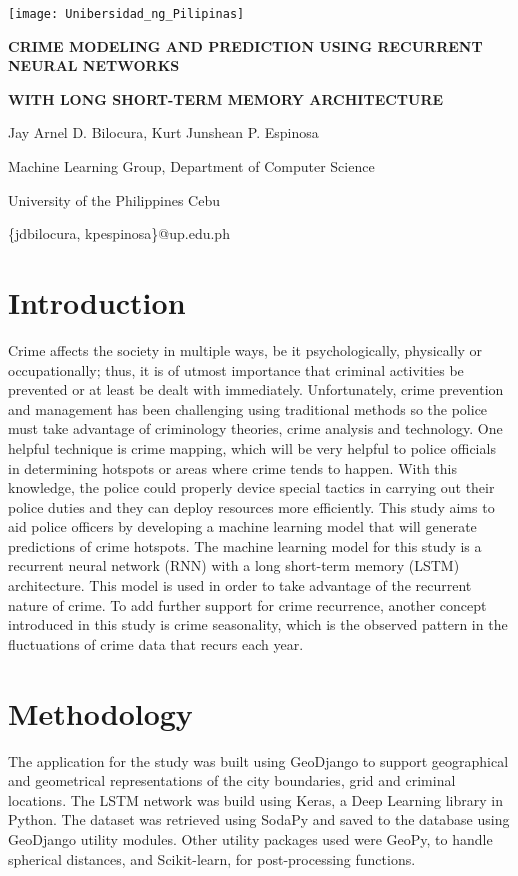 \documentclass[a0]{sciposter}
\begin{document}
    \begin{center}
    \texttt{[image: Unibersidad\_ng\_Pilipinas]}
    \par\Large\MakeUppercase{\textbf{Crime Modeling and Prediction using Recurrent Neural Networks}}
    \par\Large\MakeUppercase{\textbf{with Long Short-term Memory Architecture}}
    \par Jay Arnel D. Bilocura, Kurt Junshean P. Espinosa
    \par Machine Learning Group, Department of Computer Science
    \par University of the Philippines Cebu
    \par \{jdbilocura, kpespinosa\}@up.edu.ph
    \end{center}
    \begin{multicols}{2}
    \section {Introduction}
    Crime affects the society in multiple ways, be it psychologically, physically or occupationally; thus, it is of utmost importance that criminal activities be prevented or at least be dealt with immediately. Unfortunately, crime prevention and management has been challenging using traditional methods so the police must take advantage of criminology theories, crime analysis and technology. One helpful technique is crime mapping, which will be very helpful to police officials in determining hotspots or areas where crime tends to happen. With this knowledge, the police could properly device special tactics in carrying out their police duties and they can deploy resources more efficiently. This study aims to aid police officers by developing a machine learning model that will generate predictions of crime hotspots. The machine learning model for this study is a recurrent neural network (RNN) with a long short-term memory (LSTM) architecture. This model is used in order to take advantage of the recurrent nature of crime. To add further support for crime recurrence, another concept introduced in this study is crime seasonality, which is the observed pattern in the fluctuations of crime data that recurs each year.
    \section {Methodology}
    The application for the study was built using GeoDjango to support geographical and geometrical representations of the city boundaries, grid and criminal locations. The LSTM network was build using Keras, a Deep Learning library in Python. The dataset was retrieved using SodaPy and saved to the database using GeoDjango utility modules. Other utility packages used were GeoPy, to handle spherical distances, and Scikit-learn, for post-processing functions.


\end{multicols}
\end{document}
